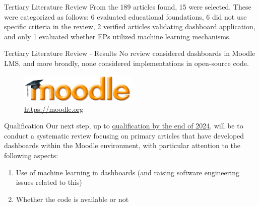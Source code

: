 \begin{frame}{Tertiary Literature Review}
    From the 189 articles found, 15 were selected. These were categorized as follows: 6 evaluated educational foundations, 6 did not use specific criteria in the review, 2 verified articles validating dashboard application, and only 1 evaluated whether EPs utilized machine learning mechanisms.
\end{frame}

\begin{frame}{Tertiary Literature Review - Results}
    No review considered dashboards in Moodle LMS, and more broadly, none considered implementations in open-source code.

    \begin{figure}[H]
        \centering
        \includegraphics[width=0.5\textwidth]{../../images/moodle.jpg}
        \\ \small \url{https://moodle.org}
    \end{figure}
\end{frame}


\begin{frame}{Qualification}
    Our next step, up to \underline{qualification by the end of 2024}, will be to conduct a systematic review focusing on primary articles that have developed dashboards within the Moodle environment, with particular attention to the following aspects: 
    
    \begin{enumerate}[<alert@+>]\color{gray}
        \item Use of machine learning in dashboards (and raising software engineering issues related to this)
        \item Whether the code is available or not
    \end{enumerate}


\end{frame}